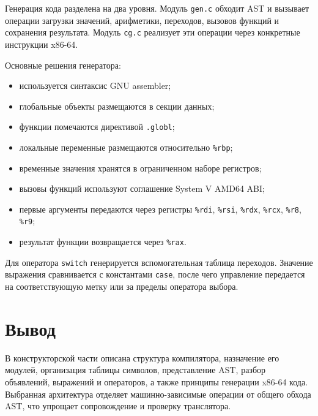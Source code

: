 Генерация кода разделена на два уровня. Модуль \texttt{gen.c} обходит AST и вызывает операции загрузки значений, арифметики, переходов, вызовов функций и сохранения результата. Модуль \texttt{cg.c} реализует эти операции через конкретные инструкции x86-64.

Основные решения генератора:

\begin{itemize}
  \item используется синтаксис GNU assembler;
  \item глобальные объекты размещаются в секции данных;
  \item функции помечаются директивой \texttt{.globl};
  \item локальные переменные размещаются относительно \texttt{\%rbp};
  \item временные значения хранятся в ограниченном наборе регистров;
  \item вызовы функций используют соглашение System V AMD64 ABI;
  \item первые аргументы передаются через регистры \texttt{\%rdi}, \texttt{\%rsi}, \texttt{\%rdx}, \texttt{\%rcx}, \texttt{\%r8}, \texttt{\%r9};
  \item результат функции возвращается через \texttt{\%rax}.
\end{itemize}

Для оператора \texttt{switch} генерируется вспомогательная таблица переходов. Значение выражения сравнивается с константами \texttt{case}, после чего управление передается на соответствующую метку или за пределы оператора выбора.

\section{Вывод}

В конструкторской части описана структура компилятора, назначение его модулей, организация таблицы символов, представление AST, разбор объявлений, выражений и операторов, а также принципы генерации x86-64 кода. Выбранная архитектура отделяет машинно-зависимые операции от общего обхода AST, что упрощает сопровождение и проверку транслятора.
